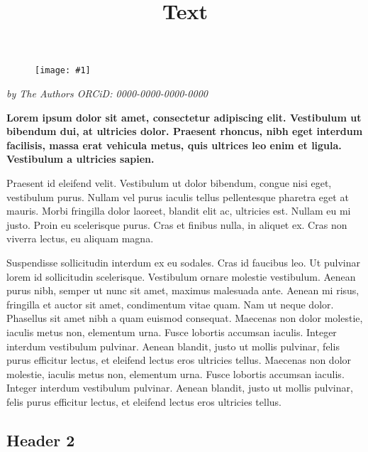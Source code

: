 \documentclass{article}
\newlength{\imgwidth}
\newcommand\scaledgraphics[2]{%
                
\settowidth{\imgwidth}{\texttt{[image: \#1]}}%
                
\setlength{\imgwidth}{\minof{\imgwidth}{#2\textwidth}}%
                
\texttt{[image: \#1]}%
                
}
\begin{document}
\title{Text}

\maketitle

\begin{figure}
\scaledgraphics{4d15bd2f-eb7c-4762-8625-d91d2f98cd5c.png}{1}
\label{F46825101}
\end{figure}


\emph{by The Authors ORCiD: 0000-0000-0000-0000}


\textbf{Lorem ipsum dolor sit amet, consectetur adipiscing elit. Vestibulum ut bibendum dui, at ultricies dolor. Praesent rhoncus, nibh eget interdum facilisis, massa erat vehicula metus, quis ultrices leo enim et ligula. Vestibulum a ultricies sapien.} 


Praesent id eleifend velit. Vestibulum ut dolor bibendum, congue nisi eget, vestibulum purus. Nullam vel purus iaculis tellus pellentesque pharetra eget at mauris.\autocite{gesis-ssoar-68697} Morbi fringilla dolor laoreet, blandit elit ac, ultricies est. Nullam eu mi justo. Proin eu scelerisque purus. Cras et finibus nulla, in aliquet ex. Cras non viverra lectus, eu aliquam magna.\autocite{gesis-ssoar-62624}


Suspendisse sollicitudin interdum ex eu sodales.\autocite{gesis-ssoar-70027} Cras id faucibus leo. Ut pulvinar lorem id sollicitudin scelerisque. Vestibulum ornare molestie vestibulum. Aenean purus nibh, semper ut nunc sit amet, maximus malesuada ante. Aenean mi risus, fringilla et auctor sit amet, condimentum vitae quam. Nam ut neque dolor.\autocite{https://doi.org/10.5281/zenodo.7809805} Phasellus sit amet nibh a quam euismod consequat. Maecenas non dolor molestie, iaculis metus non, elementum urna. Fusce lobortis accumsan iaculis. Integer interdum vestibulum pulvinar. Aenean blandit, justo ut mollis pulvinar, felis purus efficitur lectus, et eleifend lectus eros ultricies tellus. Maecenas non dolor molestie, iaculis metus non, elementum urna. Fusce lobortis accumsan iaculis. Integer interdum vestibulum pulvinar. Aenean blandit, justo ut mollis pulvinar, felis purus efficitur lectus, et eleifend lectus eros ultricies tellus.


\subsection{Header 2}\label{H3719843}
\end{document}
